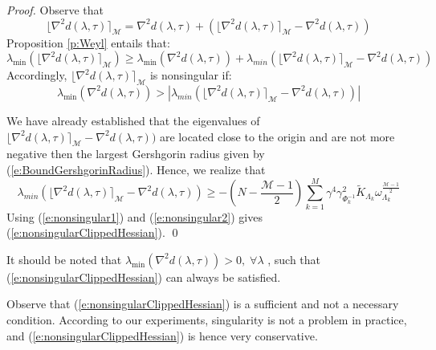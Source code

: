 \begin{proof}
Observe that
\begin{equation}
\lfloor \nabla^2 d(\lambda, \tau) \rceil_{\mathcal{M}} = \nabla^2 d(\lambda, \tau) + \left( \lfloor \nabla^2 d(\lambda, \tau) \rceil_{\mathcal{M}} - \nabla^2 d(\lambda,\tau) \right)
\end{equation}
Proposition \ref{p:Weyl} entails that:
\begin{equation}
\lambda_{\min} (\lfloor \nabla^2 d(\lambda, \tau) \rceil_{\mathcal{M}}) \geq \lambda_{\min}(\nabla^2 d(\lambda,\tau)) + \lambda_{min} (\lfloor \nabla^2 d(\lambda, \tau) \rceil_{\mathcal{M}} - \nabla^2 d(\lambda,\tau))
\end{equation}
Accordingly, $\lfloor \nabla^2 d(\lambda, \tau) \rceil_{\mathcal{M}}$ is nonsingular if:
\begin{equation} \label{e:nonsingular1}
\lambda_{\min}(\nabla^2 d(\lambda,\tau)) >  | \lambda_{min} (\lfloor \nabla^2 d(\lambda, \tau) \rceil_{\mathcal{M}} - \nabla^2 d(\lambda,\tau)) |
\end{equation}

We have already established that the eigenvalues of $\lfloor \nabla^2 d(\lambda, \tau) \rceil_{\mathcal{M}} - \nabla^2 d(\lambda,\tau))$ are located close to the origin and are not more negative then the largest Gershgorin radius given by (\ref{e:BoundGershgorinRadius}). Hence, we realize that 
\begin{equation} \label{e:nonsingular2}
\lambda_{min} (\lfloor \nabla^2 d(\lambda, \tau) \rceil_{\mathcal{M}} - \nabla^2 d(\lambda,\tau)) \geq -\left( N -\frac{\mathcal{M} - 1}{2} \right) \sum_{k=1}^M \gamma^4 \gamma_{\Phi_k^{-1}}^2 \tilde{K}_{\Lambda_k} \omega_{\Lambda_k}^{\frac{\mathcal{M} - 1}{2}}
\end{equation}
Using (\ref{e:nonsingular1}) and (\ref{e:nonsingular2}) gives (\ref{e:nonsingularClippedHessian}).
\qed
\end{proof}
\begin{remark}
It should be noted that $\lambda_{\min}(\nabla^2 d(\lambda,\tau)) > 0, \; \forall \lambda$ \cite{Klintberg2014}, such that (\ref{e:nonsingularClippedHessian}) can always be satisfied.
\end{remark}
\begin{remark}
Observe that (\ref{e:nonsingularClippedHessian}) is a sufficient and not a necessary condition. According to our experiments, singularity is not a problem in practice, and (\ref{e:nonsingularClippedHessian}) is hence very conservative.
\end{remark}

